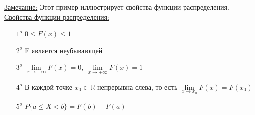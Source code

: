 \underline{Замечание:} Этот пример иллюстрирует свойства функции распределения. \\


\underline{Свойства функции распределения:} \\
\begin{enumerate}
\item[$1^o$] $0 \leqslant F(x) \leqslant 1$ 
\item[$2^o$] F является неубывающей
\item[$3^o$] $\lim\limits_{x \to -\infty} F(x) = 0$, $\lim\limits_{x \to +\infty} F(x) = 1$
\item[$4^o$] В каждой точке $x_0 \in \mathbb{R}$ непрерывна слева, то есть $\lim\limits_{x \to x_0} F(x) = F(x_0)$ 
\item[$5^o$] $P\{a \leqslant X < b\} = F(b) - F(a)$
\end{enumerate}

































